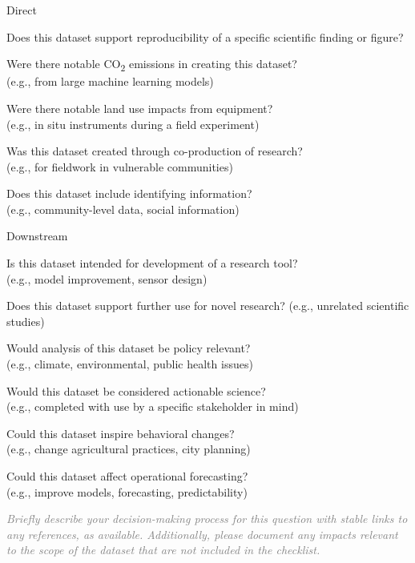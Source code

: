\documentclass[letterpaper, 10 pt, transmag]{IEEEtran}
\newcommand{\checked}{✓}
\begin{document}
Direct
\begin{todolist}
  \item Does this dataset support reproducibility of a specific scientific finding or figure?
  \item Were there notable CO\textsubscript{2} emissions in creating this dataset? \\ 
  (e.g., from large machine learning models)
  \item Were there notable land use impacts from equipment? \\
  (e.g., in situ instruments during a field experiment)
  \item Was this dataset created through co-production of research? \\
  (e.g., for fieldwork in vulnerable communities)
  \item Does this dataset include identifying information? \\
  (e.g., community-level data, social information) 
\end{todolist}

Downstream
\begin{todolist}
  \item Is this dataset intended for development of a research tool? \\
  (e.g., model improvement, sensor design)
  \item Does this dataset support further use for novel research? (e.g., unrelated scientific studies)
  \item Would analysis of this dataset be policy relevant? \\
  (e.g., climate, environmental, public health issues)
  \item Would this dataset be considered actionable science? \\ 
  (e.g., completed with use by a specific stakeholder in mind)
  \item Could this dataset inspire behavioral changes? \\
  (e.g., change agricultural practices, city planning)
  \item Could this dataset affect operational forecasting? \\
  (e.g., improve models, forecasting, predictability)
\end{todolist}
\textcolor{gray}{\textit{Briefly describe your decision-making process for this question with stable links to any references, as available. Additionally, please document any impacts relevant to the scope of the dataset that are not included in the checklist.}}
\end{document}
